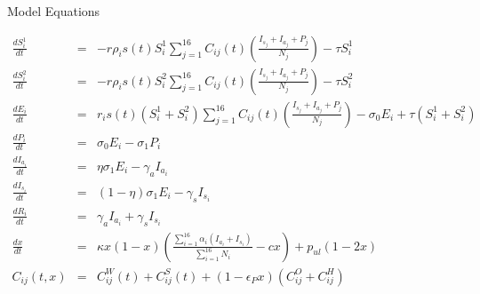 \documentclass{beamer}
\begin{document}
\begin{frame}{Model Equations}

    \tiny
        \begin{eqnarray}
            \frac{dS^1_i}{dt} &= & - r \rho_i s(t) S^1_i \sum_{j=1}^{16} C_{ij}(t) \left(\frac{I_{s_j} + I_{a_j} + P_j}{N_j}\right) - \tau S^1_i  \label{S1eqn} \\
            \frac{dS^2_i}{dt} &= & - r \rho_i s(t) S^2_i \sum_{j=1}^{16} C_{ij}(t) \left(\frac{I_{s_j} + I_{a_j}+ P_j}{N_j}\right)  - \tau S^2_i  \label{S2eqn} \\
            \frac{dE_i}{dt} &= &  r_i s(t) (S^1_i + S^2_i) \sum_{j=1}^{16} C_{ij}(t) \left(\frac{I_{s_j} + I_{a_j}+ P_j}{N_j}\right) - \sigma_0 E_i + \tau (S^1_i + S^2_i)\label{Eeqn} \\
            \frac{dP_i}{dt} &= & \sigma_0 E_i - \sigma_1 P_i \label{Peqn} \\
            \frac{dI_{a_i}}{dt} &= & \eta \sigma_1 E_i - \gamma_a I_{a_i}\label{Ieqn} \\
            \frac{dI_{s_i}}{dt} &= & (1 - \eta) \sigma_1 E_i - \gamma_s I_{s_i} \label{Ieqn} \\
            \frac{dR_i}{dt} &= & \gamma_a I_{a_i} + \gamma_s I_{s_i}  \label{Reqn} \\
            \frac{dx}{dt} &= &\kappa x (1-x) \left(\frac{\sum_{i=1}^{16}\alpha_i(I_{a_i} + I_{s_i})}{\sum_{i=1}^{16} N_i} - c x\right) + p_{ul}(1-2 x)  \label{xeqn_new}\\
    C_{ij}(t,x) &= & C^W_{ij}(t) + C^S_{ij}(t) + (1 - \epsilon_P x )\left({C}^O_{ij} + {C}^H_{ij}\right)
        \end{eqnarray}
    \end{frame}
\end{document}
